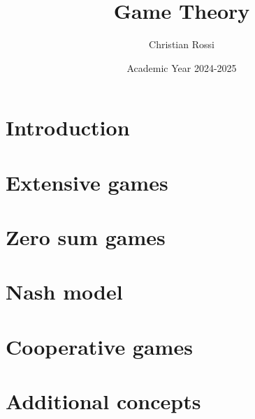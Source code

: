 \documentclass[12pt, a4paper]{report}
\title{\textbf{Game Theory}}
\author{Christian Rossi}
\date{Academic Year 2024-2025}
\begin{document}
    \maketitle

    

    \cleardoublepage{}

    \tableofcontents

    \cleardoublepage{}

    \chapter{Introduction}
    
    

    \chapter{Extensive games}
    
    
    
    
    

    \chapter{Zero sum games}
    
    
    
    
    

    \chapter{Nash model}
    
    
    
    
    
    
    

    \chapter{Cooperative games}
    
    
    
    
    
    

    \appendix
    \chapter{Additional concepts}
    
    
    
    
    
    
\end{document}
